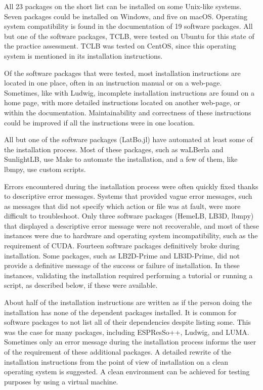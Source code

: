 \documentclass[12pt, notitlepage]{article}
\begin{document}
All 23 packages on the short list can be installed on some Unix-like systems. Seven packages could be installed on Windows, and five on macOS. Operating system compatibility is found in the documentation of 19 software packages. All but one of the software packages, TCLB, were tested on Ubuntu for this state of the practice assessment. TCLB was tested on CentOS, since this operating system is mentioned in its installation instructions.

Of the software packages that were tested, most installation instructions are located in one place, often in an instruction manual or on a web-page. Sometimes, like with Ludwig, incomplete installation instructions are found on a home page, with more detailed instructions located on another web-page, or within the documentation. Maintainability and correctness of these instructions could be improved if all the instructions were in one location. 

All but one of the software packages (LatBo.jl) have automated at least some of the installation process. Most of these packages, such as waLBerla and SunlightLB, use Make to automate the installation, and a few of them, like lbmpy, use custom scripts.

Errors encountered during the installation process were often quickly fixed thanks to descriptive error messages. Systems that provided vague error messages, such as messages that did not specify which action or file was at fault, were more difficult to troubleshoot. Only three software packages (HemeLB, LB3D, lbmpy) that displayed a descriptive error message were not recoverable, and most of these instances were due to hardware and operating system incompatibility, such as the requirement of CUDA. Fourteen software packages definitively broke during installation. Some packages, such as LB2D-Prime and LB3D-Prime, did not provide a definitive message of the success or failure of installation. In these instances, validating the installation required performing a tutorial or running a script, as described below, if these were available. 

About half of the installation instructions are written as if the person doing the installation has none of the dependent packages installed. It is common for software packages to not list all of their dependencies despite listing some. This was the case for many packages, including ESPResSo++, Ludwig, and LUMA. Sometimes only an error message during the installation process informs the user of the requirement of these additional packages. A detailed rewrite of the installation instructions from the point of view of installation on a clean operating system is suggested. A clean environment can be achieved for testing purposes by using a virtual machine.
\end{document}
